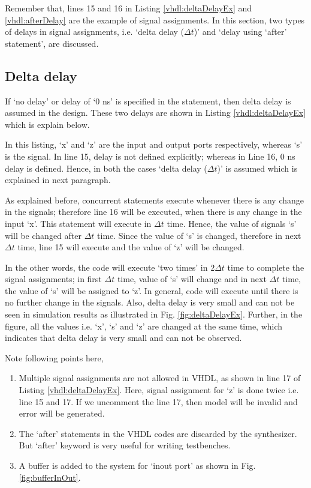 Remember that, lines 15 and 16 in Listing \ref{vhdl:deltaDelayEx} and \ref{vhdl:afterDelay} are the example of signal assignments. In this section, two types of delays in signal assignments, i.e. `delta delay ($\Delta t$)' and `delay using `after' statement', are discussed. 

\subsection{Delta delay}
If `no delay' or delay of `0 ns' is specified in the statement, then delta delay is assumed in the design. These two delays are shown in Listing \ref{vhdl:deltaDelayEx} which is explain below. 
\begin{explanation}
	In this listing, `x' and `z' are the input and output ports respectively, whereas `s' is the signal. In line 15, delay is not defined explicitly; whereas in Line 16, 0 ns delay is defined. Hence, in both the cases `delta delay ($\Delta t$)' is assumed which is explained in next paragraph. 
	
	As explained before, concurrent statements execute whenever there is any change in the signals; therefore line 16 will be executed, when there is any change in the input `x'. This statement will execute in $\Delta t$ time. Hence, the value of signals `s' will be changed after $\Delta t$ time. Since the value of `s' is changed, therefore in next $\Delta t$ time, line 15 will execute and the value of `z' will be changed. 
	
	In the other words, the code will execute `two times' in $2\Delta t$ time to complete the signal assignments; in first $\Delta t$ time, value of `s' will change and in next $\Delta t$ time, the value of `s' will be assigned to `z'. In general, code will execute until there is no further change in the signals. Also, delta delay is very small and can not be seen in simulation results as illustrated in Fig. \ref  {fig:deltaDelayEx}.	Further, in the figure, all the values i.e. `x', `s' and `z' are changed at the same time, which indicates that delta delay is very small and can not be observed. 
	
	\begin{noNumBox}
		Note following points here, 
		\begin{enumerate}
			\item Multiple signal assignments are not allowed in VHDL, as shown in line 17 of Listing \ref{vhdl:deltaDelayEx}. Here, signal assignment for `z' is done twice i.e. line 15 and 17. If we uncomment the line 17, then model will be invalid and error will be generated. 
			\item The `after' statements in the VHDL codes are discarded by the synthesizer. But `after' keyword is very useful for writing testbenches.
			\item A buffer is added to the system for `inout port' as shown in Fig. \ref{fig:bufferInOut}. 
		\end{enumerate}	
	\end{noNumBox}
\end{explanation}

